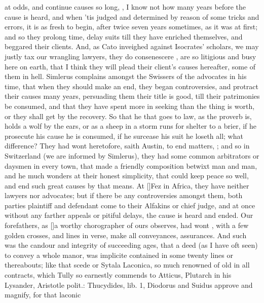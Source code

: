 {at odds, and continue causes so long, , I know not how
many years before the cause is heard, and when 'tis judged and
determined by reason of some tricks and errors, it is as fresh to
begin, after twice seven years sometimes, as it was at first; and so
they prolong time, delay suits till they have enriched themselves, and
beggared their clients. And, as Cato inveighed against Isocrates'
scholars, we may justly tax our wrangling lawyers, they do consenescere
, are so litigious and busy here on earth, that I think they
will plead their client's causes hereafter, some of them in hell. 
Simlerus complains amongst the Swissers of the advocates in his time,
that when they should make an end, they began controversies, and
protract their causes many years, persuading them their title is good,
till their patrimonies be consumed, and that they have spent more in
seeking than the thing is worth, or they shall get by the recovery. So
that he that goes to law, as the proverb is, holds a wolf by the
ears, or as a sheep in a storm runs for shelter to a brier, if he
prosecute his cause he is consumed, if he surcease his suit he loseth
all; what difference? They had wont heretofore, saith Austin, to
end matters, ; and so in Switzerland (we are
informed by Simlerus), they had some common arbitrators or daysmen
in every town, that made a friendly composition betwixt man and man,
and he much wonders at their honest simplicity, that could keep peace
so well, and end such great causes by that means. At [\baselineskip]Fez in
Africa, they have neither lawyers nor advocates; but if there be any
controversies amongst them, both parties plaintiff and defendant come
to their Alfakins or chief judge, and at once without any farther
appeals or pitiful delays, the cause is heard and ended. Our
forefathers, as [\baselineskip]a worthy chorographer of ours observes, had wont
, with a few golden crosses, and lines in
verse, make all conveyances, assurances. And such was the candour and
integrity of succeeding ages, that a deed (as I have oft seen) to
convey a whole manor, was implicite contained in some twenty lines or
thereabouts; like that scede or Sytala Laconica, so much renowned of
old in all contracts, which Tully so earnestly commends to
Atticus, Plutarch in his Lysander, Aristotle polit.: Thucydides, lib.
1, Diodorus and Suidus approve and magnify, for that laconic
}

